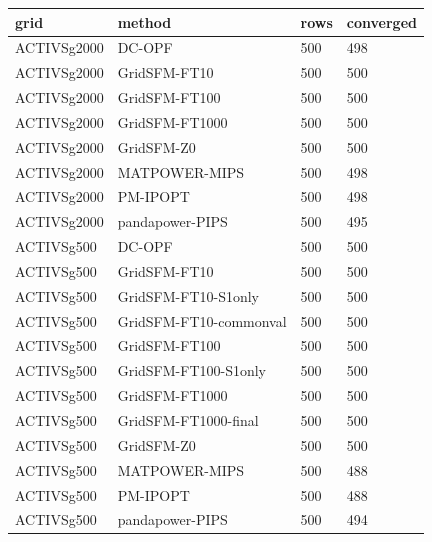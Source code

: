\begin{tabular}{llll}
\hline
grid & method & rows & converged \\
\hline
ACTIVSg2000 & DC-OPF & 500 & 498 \\
ACTIVSg2000 & GridSFM-FT10 & 500 & 500 \\
ACTIVSg2000 & GridSFM-FT100 & 500 & 500 \\
ACTIVSg2000 & GridSFM-FT1000 & 500 & 500 \\
ACTIVSg2000 & GridSFM-Z0 & 500 & 500 \\
ACTIVSg2000 & MATPOWER-MIPS & 500 & 498 \\
ACTIVSg2000 & PM-IPOPT & 500 & 498 \\
ACTIVSg2000 & pandapower-PIPS & 500 & 495 \\
ACTIVSg500 & DC-OPF & 500 & 500 \\
ACTIVSg500 & GridSFM-FT10 & 500 & 500 \\
ACTIVSg500 & GridSFM-FT10-S1only & 500 & 500 \\
ACTIVSg500 & GridSFM-FT10-commonval & 500 & 500 \\
ACTIVSg500 & GridSFM-FT100 & 500 & 500 \\
ACTIVSg500 & GridSFM-FT100-S1only & 500 & 500 \\
ACTIVSg500 & GridSFM-FT1000 & 500 & 500 \\
ACTIVSg500 & GridSFM-FT1000-final & 500 & 500 \\
ACTIVSg500 & GridSFM-Z0 & 500 & 500 \\
ACTIVSg500 & MATPOWER-MIPS & 500 & 488 \\
ACTIVSg500 & PM-IPOPT & 500 & 488 \\
ACTIVSg500 & pandapower-PIPS & 500 & 494 \\
\hline
\end{tabular}
